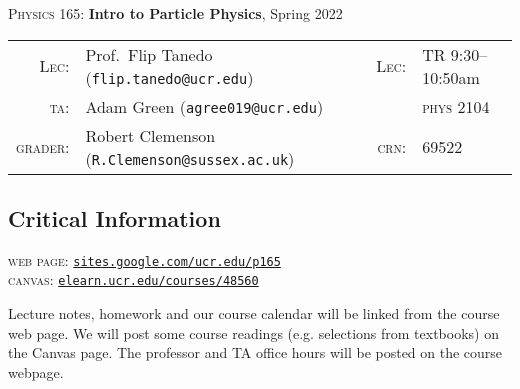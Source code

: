 \documentclass[12pt]{article}
\newcommand\acro[1]{{\small {#1}}}
\numberwithin{equation}{section}    %
\begin{document}
\begin{center}

    {\Large \textsc{Physics 165:} \textbf{Intro to Particle Physics}, Spring 2022}

\end{center}


\noindent
\begin{tabular*}{\textwidth}{rlcrl}
\textsc{Lec:}& Prof.~Flip Tanedo (\texttt{flip.tanedo@ucr.edu})
&
\hspace{.25cm}
&
\textsc{Lec:} & 
TR 9:30--10:50am 
\\
\textsc{ta:}& Adam Green (\texttt{agree019@ucr.edu})
&
\hspace{.25cm}
&
 & \textsc{phys} 2104
\\
\textsc{grader:} & Robert Clemenson (\texttt{R.Clemenson@sussex.ac.uk})
&
\hspace{.25cm}
&
\textsc{crn:} & 69522
\end{tabular*}



\subsection*{Critical Information}
\textsc{web page:} \texttt{\href{https://sites.google.com/ucr.edu/p165/}{sites.google.com/ucr.edu/p165}}\\
\textsc{canvas:} \texttt{\href{https://elearn.ucr.edu/courses/48560}{elearn.ucr.edu/courses/48560}}


\vspace{.5em}
\noindent Lecture notes, homework and our course calendar will be linked from the course web page. We will post some course readings (e.g. selections from textbooks) on the Canvas page.
%
The professor and \acro{TA} office hours will be posted on the course webpage. 
\end{document}
